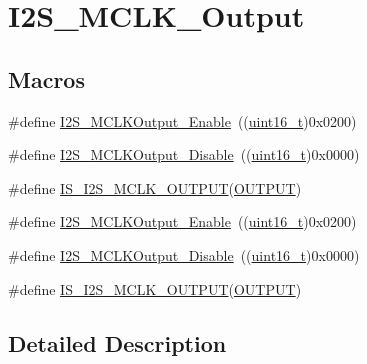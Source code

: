 \hypertarget{group___i2_s___m_c_l_k___output}{}\section{I2\+S\+\_\+\+M\+C\+L\+K\+\_\+\+Output}
\label{group___i2_s___m_c_l_k___output}
\subsection*{Macros}
\begin{DoxyCompactItemize}
\item 
\#define \hyperlink{group___i2_s___m_c_l_k___output_ga99713ee8c824f4d3bb25a9ce7bf5312a}{I2\+S\+\_\+\+M\+C\+L\+K\+Output\+\_\+\+Enable}~((\hyperlink{_p_e___types_8h_a1f1825b69244eb3ad2c7165ddc99c956}{uint16\+\_\+t})0x0200)
\item 
\#define \hyperlink{group___i2_s___m_c_l_k___output_gaea09824d7e6359924152277ed3661e7e}{I2\+S\+\_\+\+M\+C\+L\+K\+Output\+\_\+\+Disable}~((\hyperlink{_p_e___types_8h_a1f1825b69244eb3ad2c7165ddc99c956}{uint16\+\_\+t})0x0000)
\item 
\#define \hyperlink{group___i2_s___m_c_l_k___output_ga829ae526d1d11f14592e881f800fbb8a}{I\+S\+\_\+\+I2\+S\+\_\+\+M\+C\+L\+K\+\_\+\+O\+U\+T\+P\+UT}(\hyperlink{pins_8h_a77fecc1883f27c095012fbe56345c4dba2ab08d3e103968f5f4f26b66a52e99d6}{O\+U\+T\+P\+UT})
\item 
\#define \hyperlink{group___i2_s___m_c_l_k___output_ga99713ee8c824f4d3bb25a9ce7bf5312a}{I2\+S\+\_\+\+M\+C\+L\+K\+Output\+\_\+\+Enable}~((\hyperlink{_p_e___types_8h_a1f1825b69244eb3ad2c7165ddc99c956}{uint16\+\_\+t})0x0200)
\item 
\#define \hyperlink{group___i2_s___m_c_l_k___output_gaea09824d7e6359924152277ed3661e7e}{I2\+S\+\_\+\+M\+C\+L\+K\+Output\+\_\+\+Disable}~((\hyperlink{_p_e___types_8h_a1f1825b69244eb3ad2c7165ddc99c956}{uint16\+\_\+t})0x0000)
\item 
\#define \hyperlink{group___i2_s___m_c_l_k___output_ga829ae526d1d11f14592e881f800fbb8a}{I\+S\+\_\+\+I2\+S\+\_\+\+M\+C\+L\+K\+\_\+\+O\+U\+T\+P\+UT}(\hyperlink{pins_8h_a77fecc1883f27c095012fbe56345c4dba2ab08d3e103968f5f4f26b66a52e99d6}{O\+U\+T\+P\+UT})
\end{DoxyCompactItemize}


\subsection{Detailed Description}


